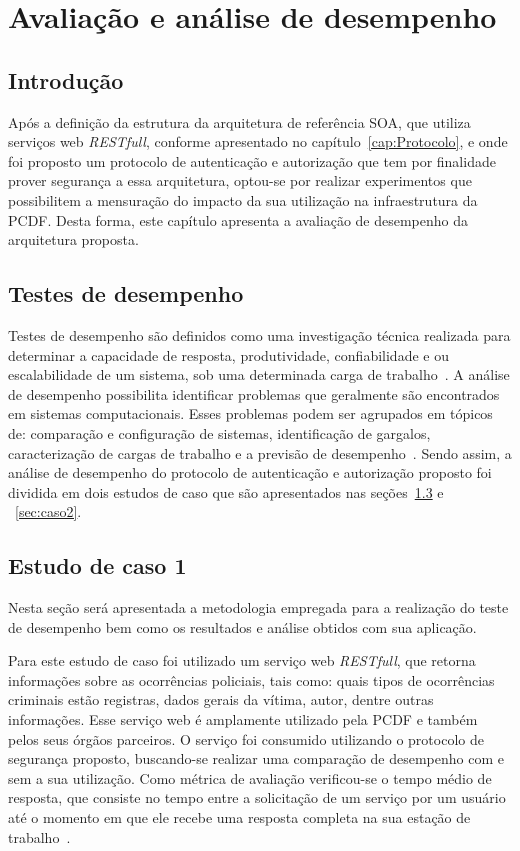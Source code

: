 \chapter{Avaliação e análise de desempenho}

\section{Introdução}

Após a definição da estrutura da arquitetura de referência SOA, que utiliza serviços web \emph{RESTfull}, conforme apresentado no capítulo~\ref{cap:Protocolo},  e onde foi proposto um protocolo de autenticação e autorização que tem por finalidade prover segurança a essa arquitetura, optou-se por realizar experimentos que possibilitem a mensuração do impacto da sua utilização na infraestrutura da PCDF. Desta forma, este capítulo apresenta a avaliação de desempenho da arquitetura proposta.

\section{Testes de desempenho}

Testes de desempenho são definidos como uma investigação técnica realizada para determinar a capacidade de resposta, produtividade, confiabilidade e ou escalabilidade de um sistema, sob uma determinada carga de trabalho~\cite{Meier2007}.
A análise de desempenho possibilita identificar problemas que geralmente são encontrados em sistemas computacionais. Esses problemas podem ser agrupados em tópicos de: comparação e configuração de sistemas, identificação de gargalos, caracterização de cargas de trabalho e a previsão de desempenho~\cite{jain1991art}. Sendo assim, a análise de desempenho do protocolo de autenticação e autorização proposto foi dividida em dois estudos de caso que são apresentados nas seções~\ref{sec:caso1} e ~\ref{sec:caso2}.

\section{Estudo de caso 1}\label{sec:caso1}

Nesta seção será apresentada a metodologia empregada para a realização do teste de desempenho bem como os resultados e análise obtidos com sua aplicação.

Para este estudo de caso foi utilizado um serviço web \emph{RESTfull}, que retorna informações sobre as ocorrências policiais, tais como: quais tipos de ocorrências criminais estão registras, dados gerais da vítima, autor, dentre outras informações. Esse serviço web é amplamente utilizado pela PCDF e também pelos seus órgãos parceiros. O serviço foi consumido utilizando o protocolo de segurança proposto, buscando-se realizar uma comparação de desempenho com e sem a sua utilização. Como métrica de avaliação verificou-se o tempo médio de resposta, que consiste no tempo entre a solicitação de um serviço por um usuário até o momento em que ele recebe uma resposta completa na sua estação de trabalho~\cite{ Molyneaux2009}.

